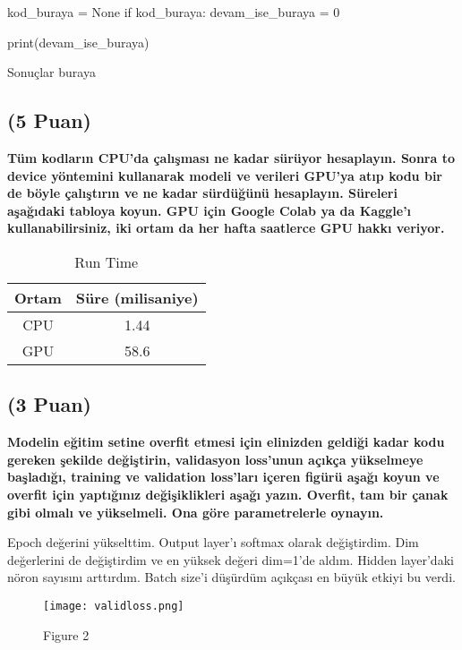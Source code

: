 \documentclass[11pt]{article}
\begin{document}
\begin{python}
kod_buraya = None
if kod_buraya:
    devam_ise_buraya = 0

print(devam_ise_buraya)
\end{python}

Sonuçlar buraya

\subsection{(5 Puan)} \textbf{Tüm kodların CPU'da çalışması ne kadar sürüyor hesaplayın. Sonra to device yöntemini kullanarak modeli ve verileri GPU'ya atıp kodu bir de böyle çalıştırın ve ne kadar sürdüğünü hesaplayın. Süreleri aşağıdaki tabloya koyun. GPU için Google Colab ya da Kaggle'ı kullanabilirsiniz, iki ortam da her hafta saatlerce GPU hakkı veriyor.}

\begin{table}[ht!]
    \centering
    \caption{Run Time}
    \begin{tabular}{c|c}
        Ortam & Süre (milisaniye) \\\hline
        CPU & 1.44 \\
        GPU & 58.6\\
    \end{tabular}
    \label{tab:my_table}
\end{table}

\subsection{(3 Puan)} \textbf{Modelin eğitim setine overfit etmesi için elinizden geldiği kadar kodu gereken şekilde değiştirin, validasyon loss'unun açıkça yükselmeye başladığı, training ve validation loss'ları içeren figürü aşağı koyun ve overfit için yaptığınız değişiklikleri aşağı yazın. Overfit, tam bir çanak gibi olmalı ve yükselmeli. Ona göre parametrelerle oynayın.}

Epoch değerini yükselttim. Output layer'ı softmax olarak değiştirdim. Dim değerlerini de değiştirdim ve en yüksek değeri dim=1'de aldım. Hidden layer'daki nöron sayısını arttırdım. Batch size'i düşürdüm açıkçası en büyük etkiyi bu verdi.


\begin{figure}[ht!]
    \centering
    \texttt{[image: validloss.png]}
    \caption{Figure 2}
    \label{fig:my_pic}
\end{figure}
\end{document}
